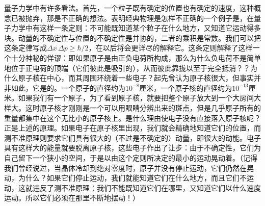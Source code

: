 \documentclass[11pt,oneside]{book}
\begin{document}
\begin{common-format}
量子力学中有许多看法。首先，一个粒子既有确定的位置也有确定的速度，这种概念已被抛弃，那是不正确的想法。表明经典物理是怎样不正确的一个例子是，在量子力学中有这样一条定则：不可能既知道某个粒子在什么地方，又知道它运动得多块。动量的不确定性与位置的不确定性是并协的，二者的乘积是常数。我们可以把这条定律写成$ \Delta x\,\Delta p\geq\hbar/2 $，在以后将会更详尽的解释它。这条定则解释了这样一个十分神秘的佯谬：即如果原子是由正负电荷所构成，那么为什么负电荷不是简单地位于正电荷的顶端（它们彼此是吸引的），从而彼此靠拢以至于完全抵消？？为什么原子核在中心，而其周围环绕着一些电子？起先曾认为原子核很大，但事实并非如此，它是的。一个原子的直径约为$ 10^{-8} $厘米，一个原子核的直径约为$ 10^{-13} $厘米。如果我们有一个原子，为了看到原子核，就要把整个原子放大到一个大房间大样大。这时原子核才刚刚是一个可以用眼睛分辨出来的斑点，但是几乎原子所有的重量都集中在这个无比小的原子核上。是什么理由使电子没有直接落入原子核呢？正是上述的原理。如果电子在原子核里出现，我们就会精确地知道它们的位置，而测不准原理则要求它们具有很大的（不过是不确定的）动量，即很大的动能。电子具有这样大的能量就要脱离原子核，这些电子作出了让步：由于不确定性，它们为自己留下一个狭小的空间，于是以由这个定则所决定的最小的运动晃动着。（记得我们曾经说过，当晶体冷却到绝对零度时，原子并没有停止运动，它们仍然在晃动，为什么？如果它们停止运动，我们就能知道它们在什么地方，而且它们不运动，这就违反了测不准原理：我们不能既知道它们在哪里，又知道它们以什么速度运动。所以它们必须在那里不断地摆动！）


\end{common-format}
\end{document}
